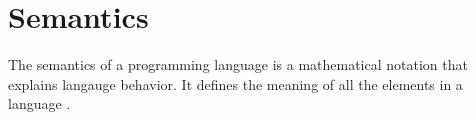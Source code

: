 \section{Semantics}
\label{sec:semantics}

The semantics of a programming language is a mathematical notation that explains langauge behavior. It defines the meaning of all the elements in a language \cite{misc:sem}.
